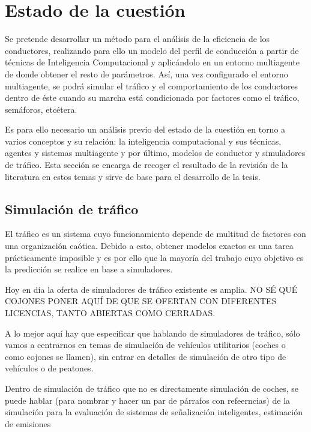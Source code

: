 \chapter{Estado de la cuestión}
\label{ch:state-of-the-art}

Se pretende desarrollar un método para el análisis de la eficiencia de los conductores, realizando para ello un modelo del perfil de conducción a partir de técnicas de Inteligencia Computacional y aplicándolo en un entorno multiagente de donde obtener el resto de parámetros. Así, una vez configurado el entorno multiagente, se podrá simular el tráfico y el comportamiento de los conductores dentro de éste cuando su marcha está condicionada por factores como el tráfico, semáforos, etcétera.

Es para ello necesario un análisis previo del estado de la cuestión en torno a varios conceptos y su relación: la inteligencia computacional y sus técnicas, agentes y sistemas multiagente y por último, modelos de conductor y simuladores de tráfico. Esta sección se encarga de recoger el resultado de la revisión de la literatura en estos temas y sirve de base para el desarrollo de la tesis.

\section{Simulación de tráfico}

El tráfico es un sistema cuyo funcionamiento depende de multitud de factores con una organización caótica. Debido a esto, obtener modelos exactos es una tarea prácticamente imposible y es por ello que la mayoría del trabajo cuyo objetivo es la predicción se realice en base a simuladores.

Hoy en día la oferta de simuladores de tráfico existente es amplia. NO SÉ QUÉ COJONES PONER AQUÍ DE QUE SE OFERTAN CON DIFERENTES LICENCIAS, TANTO ABIERTAS COMO CERRADAS.

A lo mejor aquí hay que especificar que hablando de simuladores de tráfico, sólo vamos a centrarnos en temas de simulación de vehículos utilitarios (coches o como cojones se llamen), sin entrar en detalles de simulación de otro tipo de vehículos o de peatones.

Dentro de simulación de tráfico que no es directamente simulación de coches, se  puede hablar (para nombrar y hacer un par de párrafos con refeerncias) de la simulación para la evaluación de sistemas de señalización inteligentes\cite{jin2016evaluation}, estimación de emisiones\cite{quaassdorff2016microscale}

